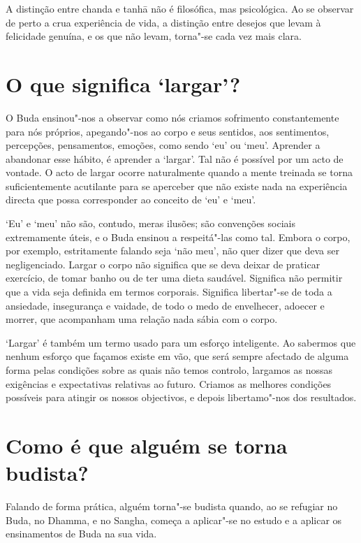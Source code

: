 A distinção entre chanda e tanhā não é filosófica, mas psicológica. Ao
se observar de perto a crua experiência de vida, a distinção entre
desejos que levam à felicidade genuína, e os que não levam, torna"-se
cada vez mais clara.

\section{O que significa `largar'?}

O Buda ensinou"-nos a observar como nós criamos sofrimento constantemente
para nós próprios, apegando"-nos ao corpo e seus sentidos, aos
sentimentos, percepções, pensamentos, emoções, como sendo `eu' ou `meu'.
Aprender a abandonar esse hábito, é aprender a `largar'. Tal não é
possível por um acto de vontade. O acto de largar ocorre naturalmente
quando a mente treinada se torna suficientemente acutilante para se
aperceber que não existe nada na experiência directa que possa
corresponder ao conceito de `eu' e `meu'.

`Eu' e `meu' não são, contudo, meras ilusões; são convenções sociais
extremamente úteis, e o Buda ensinou a respeitá"-las como tal. Embora o
corpo, por exemplo, estritamente falando seja `não meu', não quer dizer
que deva ser negligenciado. Largar o corpo não significa que se deva
deixar de praticar exercício, de tomar banho ou de ter uma dieta
saudável. Significa não permitir que a vida seja definida em termos
corporais. Significa libertar"-se de toda a ansiedade, insegurança e
vaidade, de todo o medo de envelhecer, adoecer e morrer, que acompanham
uma relação nada sábia com o corpo.

`Largar' é também um termo usado para um esforço inteligente. Ao
sabermos que nenhum esforço que façamos existe em vão, que será sempre
afectado de alguma forma pelas condições sobre as quais não temos
controlo, largamos as nossas exigências e expectativas relativas ao
futuro. Criamos as melhores condições possíveis para atingir os nossos
objectivos, e depois libertamo"-nos dos resultados.

\section{Como é que alguém se torna budista?}

Falando de forma prática, alguém torna"-se budista quando, ao se refugiar
no Buda, no Dhamma, e no Sangha, começa a aplicar"-se no estudo e a
aplicar os ensinamentos de Buda na sua vida.

